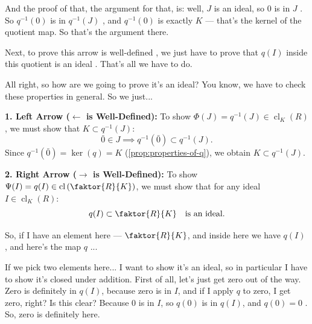 \begin{proofWrapper}
\begin{speech}[00:23:35 - 00:25:06]
And the proof of that, the argument for that, is: well, $J$ is an ideal, so $0$ is in $J$ . So $q^{-1}(0)$ is in $q^{-1}(J)$ , and $q^{-1}(0)$ is exactly $K$  --- that's the kernel of the quotient map. So that's the argument there.

Next, to prove this arrow  is well-defined , we just have to prove that  $q(I)$ inside this quotient is an ideal . That's all we have to do.

All right, so how are we going to prove it's an ideal? You know, we have to check these properties in general. So we just...
\end{speech}

\begin{content}
\textbf{1. Left Arrow ($\longleftarrow$ is Well-Defined):}
To show $\Phi(J) = q^{-1}(J) \in \operatorname{cl}_K(R)$, we must show that $K \subset q^{-1}(J)$:
\[
\bar{0} \in J \implies q^{-1}(\bar{0}) \subset q^{-1}(J).
\]
Since $q^{-1}(\bar{0}) = \ker(q) = K$ (\cref{prop:properties-of-q}), we obtain $K \subset q^{-1}(J)$.

\textbf{2. Right Arrow ($\longrightarrow$ is Well-Defined):}
To show $\Psi(I) = q(I) \in \operatorname{cl}\left(\faktor{R}{K}\right)$, we must show that for any ideal $I \in \operatorname{cl}_K(R)$:
\[
q(I) \subset \faktor{R}{K} \quad \text{is an ideal.}
\]
\end{content}

\begin{speech}[00:25:06 - 00:26:54]
So, if I have an element here  --- $\faktor{R}{K}$, and inside here we have $q(I)$ , and here's the map $q$ ...

If we pick two elements here... I want to show it's an ideal, so in particular I have to show it's closed under addition. First of all, let's just get zero out of the way. Zero is definitely in $q(I)$, because zero is in $I$, and if I apply $q$ to zero, I get zero, right?  Is this clear? Because $0$ is in $I$, so $q(0)$ is in $q(I)$, and $q(0) = 0$ . So, zero is definitely here.


\end{speech}
\end{proofWrapper}
